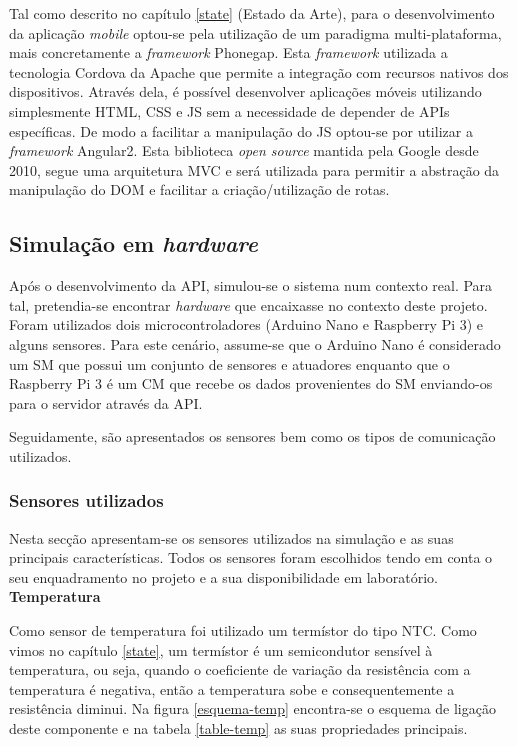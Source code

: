 \newpage


Tal como descrito no capítulo \ref{state} (Estado da Arte), para o desenvolvimento da aplicação \textit{mobile} optou-se pela utilização de um paradigma multi-plataforma, mais concretamente a \textit{framework} Phonegap. Esta \textit{framework} utilizada a tecnologia Cordova da Apache que permite a integração com recursos nativos dos dispositivos. Através dela, é possível desenvolver aplicações móveis utilizando simplesmente \ac{HTML}, \ac{CSS} e \ac{JS} sem a necessidade de depender de APIs específicas. De modo a facilitar a manipulação do \ac{JS} optou-se por utilizar a \textit{framework} Angular2. Esta biblioteca \textit{open source} mantida pela Google desde 2010, segue uma arquitetura \ac{MVC} e será utilizada para permitir a abstração da manipulação do \ac{DOM} e facilitar a criação/utilização de rotas\cite{Google2015}.



\newpage
\subsection{Simulação em \textit{hardware}}
\label{arq-hardw}


Após o desenvolvimento da \ac{API}, simulou-se o sistema num contexto real. Para tal, pretendia-se encontrar \textit{hardware} que encaixasse no contexto deste projeto. Foram utilizados dois microcontroladores (Arduino Nano e Raspberry Pi 3) e alguns sensores. Para este cenário, assume-se que o Arduino Nano é considerado um \acl{SM} que possui um conjunto de sensores e atuadores enquanto que o Raspberry Pi 3 é um \acl{CM} que recebe os dados provenientes do \acl{SM} enviando-os para o servidor através da API.  

Seguidamente, são apresentados os sensores bem como os tipos de comunicação utilizados. 
 

\subsubsection{Sensores utilizados}

Nesta secção apresentam-se os sensores utilizados na simulação e as suas principais características. Todos os sensores foram escolhidos tendo em conta o seu enquadramento no projeto e a sua disponibilidade em laboratório. \\


\textbf{Temperatura}


Como sensor de temperatura foi utilizado um termístor do tipo \ac{NTC}. Como vimos no capítulo \ref{state}, um termístor é um semicondutor sensível à temperatura, ou seja, quando o coeficiente de variação da resistência com a temperatura é negativa, então a temperatura sobe e consequentemente a resistência diminui. Na figura \ref{esquema-temp} encontra-se o esquema de ligação deste componente e na tabela \ref{table-temp} as suas propriedades principais\cite{temp-dta}. 


